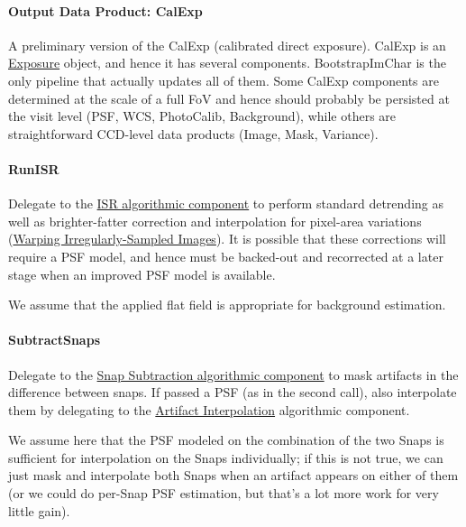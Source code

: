 \paragraph{Output Data Product: CalExp}
\label{sec:drpBootstrapImChar_calexp}

A preliminary version of the CalExp (calibrated direct exposure).  CalExp is an \hyperref[sec:spImagesExposure]{Exposure} object, and hence it has several components.  BootstrapImChar is the only pipeline that actually updates all of them.  Some CalExp components are determined at the scale of a full FoV and hence should probably be persisted at the visit level (PSF, WCS, PhotoCalib, Background), while others are straightforward CCD-level data products (Image, Mask, Variance).

\paragraph{RunISR}
\label{sec:drpBootstrapImChar_RunISR}

Delegate to the \hyperref[sec:acISR]{ISR algorithmic component} to perform standard detrending as well as brighter-fatter correction and interpolation for pixel-area variations (\hyperref[sec:acFixPixelAreaVariations]{Warping Irregularly-Sampled Images}).  It is possible that these corrections will require a PSF model, and hence must be backed-out and recorrected at a later stage when an improved PSF model is available.

We assume that the applied flat field is appropriate for background estimation.

\paragraph{SubtractSnaps}
\label{sec:drpBootstrapImChar_SubtractSnaps}

Delegate to the \hyperref[sec:acSnapSubtraction]{Snap Subtraction algorithmic component} to mask artifacts in the difference between snaps.  If passed a PSF (as in the second call), also interpolate them by delegating to the \hyperref[sec:acArtifactInterpolation]{Artifact Interpolation} algorithmic component.

We assume here that the PSF modeled on the combination of the two Snaps is sufficient for interpolation on the Snaps individually; if this is not true, we can just mask and interpolate both Snaps when an artifact appears on either of them (or we could do per-Snap PSF estimation, but that's a lot more work for very little gain).

